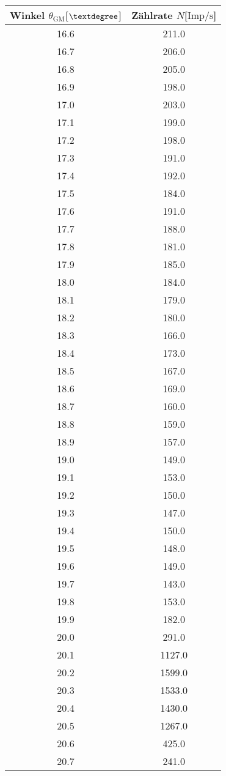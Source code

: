 \begin{table}
\begin{minipage}{0.5\textwidth}
\centering
\label{tab:ogemessdaten3}
\begin{tabular}{c c}
    \toprule
    Winkel $\theta_{\text{GM}}$[$\textdegree$] & Zählrate $N$[$\si{{\text{Imp}}\per\second}$]\\
    \midrule
16.6&	211.0\\
16.7&	206.0\\
16.8&	205.0\\
16.9&	198.0\\
17.0&	203.0\\
17.1&	199.0\\
17.2&	198.0\\
17.3&	191.0\\
17.4&	192.0\\
17.5&	184.0\\
17.6&	191.0\\
17.7&	188.0\\
17.8&	181.0\\
17.9&	185.0\\
18.0&	184.0\\
18.1&	179.0\\
18.2&	180.0\\
18.3&	166.0\\
18.4&	173.0\\
18.5&	167.0\\
18.6&	169.0\\
18.7&	160.0\\
18.8&	159.0\\
18.9&	157.0\\
19.0&	149.0\\
19.1&	153.0\\
19.2&	150.0\\
19.3&	147.0\\
19.4&	150.0\\
19.5&	148.0\\
19.6&	149.0\\
19.7&	143.0\\
19.8&	153.0\\
19.9&	182.0\\
20.0&	291.0\\
20.1&	1127.0\\
20.2&	1599.0\\
20.3&	1533.0\\
20.4&	1430.0\\
20.5&	1267.0\\
20.6&	425.0\\
20.7&	241.0\\

\end{tabular}
\end{minipage}
\end{table}
